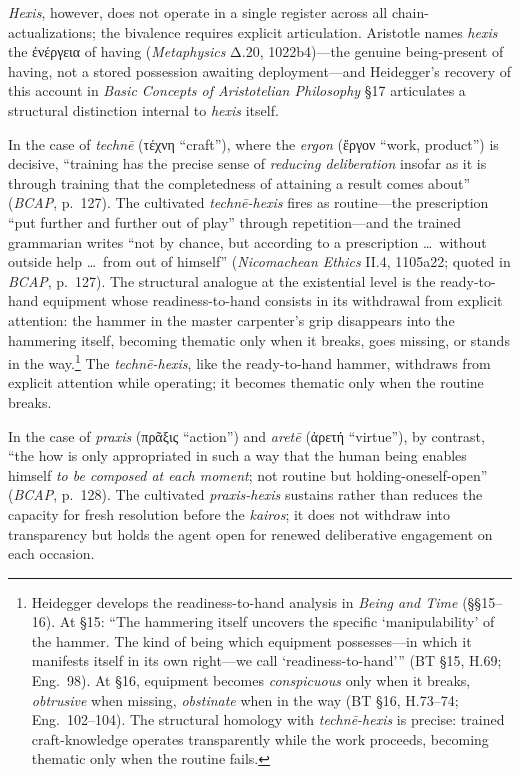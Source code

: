 \documentclass{article}
\newcommand{\gk}[1]{{\greekfont #1}}
\begin{document}
\textit{Hexis}, however, does not operate in a single register across all chain-actualizations; the bivalence requires explicit articulation. Aristotle names \textit{hexis} the \gk{ἐνέργεια} of having (\textit{Metaphysics} Δ.20, 1022b4)---the genuine being-present of having, not a stored possession awaiting deployment---and Heidegger's recovery of this account in \textit{Basic Concepts of Aristotelian Philosophy} \S17 articulates a structural distinction internal to \textit{hexis} itself.

In the case of \textit{technē} (\gk{τέχνη} ``craft''), where the \textit{ergon} (\gk{ἔργον} ``work, product'') is decisive, ``training has the precise sense of \textit{reducing deliberation} insofar as it is through training that the completedness of attaining a result comes about'' (\textit{BCAP}, p.~127). The cultivated \textit{technē-hexis} fires as routine---the prescription ``put further and further out of play'' through repetition---and the trained grammarian writes ``not by chance, but according to a prescription \ldots\ without outside help \ldots\ from out of himself'' (\textit{Nicomachean Ethics} II.4, 1105a22; quoted in \textit{BCAP}, p.~127). The structural analogue at the existential level is the ready-to-hand equipment whose readiness-to-hand consists in its withdrawal from explicit attention: the hammer in the master carpenter's grip disappears into the hammering itself, becoming thematic only when it breaks, goes missing, or stands in the way.\footnote{Heidegger develops the readiness-to-hand analysis in \textit{Being and Time} (\S\S15--16). At \S15: ``The hammering itself uncovers the specific `manipulability' of the hammer. The kind of being which equipment possesses---in which it manifests itself in its own right---we call `readiness-to-hand''' (BT \S15, H.69; Eng.~98). At \S16, equipment becomes \textit{conspicuous} only when it breaks, \textit{obtrusive} when missing, \textit{obstinate} when in the way (BT \S16, H.73--74; Eng.~102--104). The structural homology with \textit{technē-hexis} is precise: trained craft-knowledge operates transparently while the work proceeds, becoming thematic only when the routine fails.} The \textit{technē-hexis}, like the ready-to-hand hammer, withdraws from explicit attention while operating; it becomes thematic only when the routine breaks.

In the case of \textit{praxis} (\gk{πρᾶξις} ``action'') and \textit{aretē} (\gk{ἀρετή} ``virtue''), by contrast, ``the how is only appropriated in such a way that the human being enables himself \textit{to be composed at each moment}; not routine but holding-oneself-open'' (\textit{BCAP}, p.~128). The cultivated \textit{praxis-hexis} sustains rather than reduces the capacity for fresh resolution before the \textit{kairos}; it does not withdraw into transparency but holds the agent open for renewed deliberative engagement on each occasion.
\end{document}
